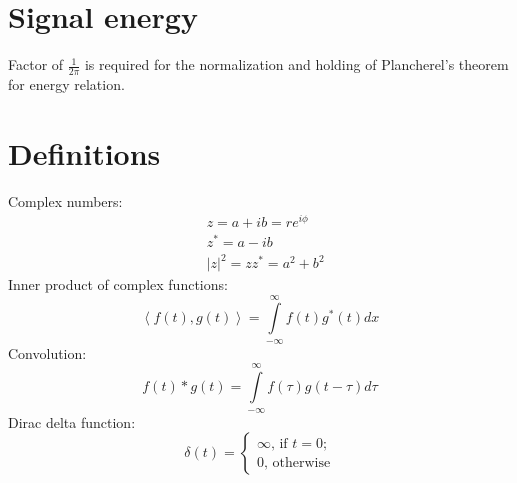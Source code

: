 \documentclass{article}
\begin{document}
\section{Signal energy}
Factor of $\frac{1}{2 \pi}$ is required for the normalization and holding of Plancherel's theorem for energy relation.


\section{Definitions}
Complex numbers:
\begin{align*}
    &z = a + ib = r e^{i\phi} \\
    &z^* = a - ib \\
    &\left| z \right| ^2 = z z^* = a^2 + b^2
\end{align*}
Inner product of complex functions:
\begin{equation*}
    \left< f(t),g(t) \right> = \int \limits^{\infty}_{-\infty} f(t) g^{*}(t) dx
\end{equation*}
Convolution:
\begin{equation*}
f(t) * g(t) =  \int \limits^{\infty}_{-\infty} f(\tau ) g(t - \tau) d \tau
\end{equation*}
Dirac delta function:
\begin{equation*}
    \delta(t) =  \begin{cases}
        \infty, \, \text{if $t = 0$};\\
        0, \, \text{otherwise}
    \end{cases}
\end{equation*}



\end{document}
